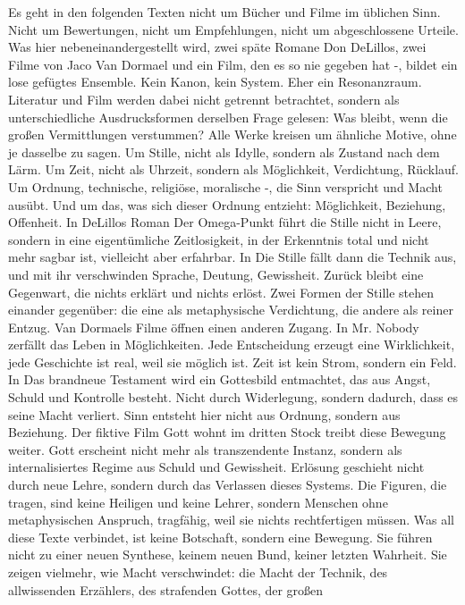 \documentclass[
  ngerman,
]{article}
\begin{document}
Es geht in den folgenden Texten nicht um Bücher und Filme im üblichen
Sinn. Nicht um Bewertungen, nicht um Empfehlungen, nicht um
abgeschlossene Urteile. Was hier nebeneinandergestellt wird, zwei späte
Romane Don DeLillos, zwei Filme von Jaco Van Dormael und ein Film, den
es so nie gegeben hat -, bildet ein lose gefügtes Ensemble. Kein Kanon,
kein System. Eher ein Resonanzraum. Literatur und Film werden dabei
nicht getrennt betrachtet, sondern als unterschiedliche Ausdrucksformen
derselben Frage gelesen: Was bleibt, wenn die großen Vermittlungen
verstummen? Alle Werke kreisen um ähnliche Motive, ohne je dasselbe zu
sagen. Um Stille, nicht als Idylle, sondern als Zustand nach dem Lärm.
Um Zeit, nicht als Uhrzeit, sondern als Möglichkeit, Verdichtung,
Rücklauf. Um Ordnung, technische, religiöse, moralische -, die Sinn
verspricht und Macht ausübt. Und um das, was sich dieser Ordnung
entzieht: Möglichkeit, Beziehung, Offenheit. In DeLillos Roman Der
Omega-Punkt führt die Stille nicht in Leere, sondern in eine
eigentümliche Zeitlosigkeit, in der Erkenntnis total und nicht mehr
sagbar ist, vielleicht aber erfahrbar. In Die Stille fällt dann die
Technik aus, und mit ihr verschwinden Sprache, Deutung, Gewissheit.
Zurück bleibt eine Gegenwart, die nichts erklärt und nichts erlöst. Zwei
Formen der Stille stehen einander gegenüber: die eine als metaphysische
Verdichtung, die andere als reiner Entzug. Van Dormaels Filme öffnen
einen anderen Zugang. In Mr. Nobody zerfällt das Leben in Möglichkeiten.
Jede Entscheidung erzeugt eine Wirklichkeit, jede Geschichte ist real,
weil sie möglich ist. Zeit ist kein Strom, sondern ein Feld. In Das
brandneue Testament wird ein Gottesbild entmachtet, das aus Angst,
Schuld und Kontrolle besteht. Nicht durch Widerlegung, sondern dadurch,
dass es seine Macht verliert. Sinn entsteht hier nicht aus Ordnung,
sondern aus Beziehung. Der fiktive Film Gott wohnt im dritten Stock
treibt diese Bewegung weiter. Gott erscheint nicht mehr als
transzendente Instanz, sondern als internalisiertes Regime aus Schuld
und Gewissheit. Erlösung geschieht nicht durch neue Lehre, sondern durch
das Verlassen dieses Systems. Die Figuren, die tragen, sind keine
Heiligen und keine Lehrer, sondern Menschen ohne metaphysischen
Anspruch, tragfähig, weil sie nichts rechtfertigen müssen. Was all diese
Texte verbindet, ist keine Botschaft, sondern eine Bewegung. Sie führen
nicht zu einer neuen Synthese, keinem neuen Bund, keiner letzten
Wahrheit. Sie zeigen vielmehr, wie Macht verschwindet: die Macht der
Technik, des allwissenden Erzählers, des strafenden Gottes, der großen
\end{document}
